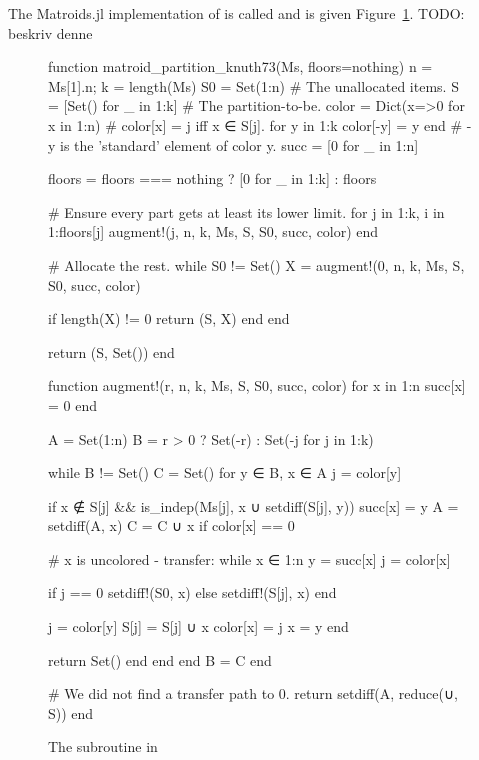 The Matroids.jl implementation of  is called\linebreak{} and is given Figure~\ref{code:matroid_partition_knuth73}. TODO: beskriv denne
\skelpar

\begin{figure}
\begin{jllisting}
    
function matroid_partition_knuth73(Ms, floors=nothing)
  n = Ms[1].n; k = length(Ms)
  S0 = Set(1:n) # The unallocated items.
  S = [Set() for _ in 1:k] # The partition-to-be.
  color = Dict(x=>0 for x in 1:n) # color[x] = j iff x ∈ S[j].
  for y in 1:k color[-y] = y end # -y is the 'standard' element of color y.
  succ = [0 for _ in 1:n]

  floors = floors === nothing ? [0 for _ in 1:k] : floors

  # Ensure every part gets at least its lower limit.
  for j in 1:k, i in 1:floors[j]
    augment!(j, n, k, Ms, S, S0, succ, color)
  end

  # Allocate the rest.
  while S0 != Set()
    X = augment!(0, n, k, Ms, S, S0, succ, color)
    
    if length(X) != 0
      return (S, X)
    end
  end

  return (S, Set())
end
    
\end{jllisting}
\caption{}
\label{code:matroid_partition_knuth73}
\end{figure}

\begin{figure}[ht!]
\begin{jllisting}

function augment!(r, n, k, Ms, S, S0, succ, color)
  for x in 1:n succ[x] = 0 end
  
  A = Set(1:n)
  B = r > 0 ? Set(-r) : Set(-j for j in 1:k)
  
  while B != Set()
    C = Set()
    for y ∈ B, x ∈ A
      j = color[y]

      if x ∉ S[j] && is_indep(Ms[j], x ∪ setdiff(S[j], y))
        succ[x] = y
        A = setdiff(A, x)
        C = C ∪ x
        if color[x] == 0 

          # x is uncolored - transfer:
          while x ∈ 1:n
            y = succ[x]
            j = color[x]
            
            if j == 0 setdiff!(S0, x) else setdiff!(S[j], x) end
        
            j = color[y]
            S[j] = S[j] ∪ x
            color[x] = j
            x = y
          end

          return Set() 
        end
      end
    end
    B = C
  end

  # We did not find a transfer path to 0.
  return setdiff(A, reduce(∪, S))
end

\end{jllisting}
\caption{The  subroutine in }
\end{figure}

